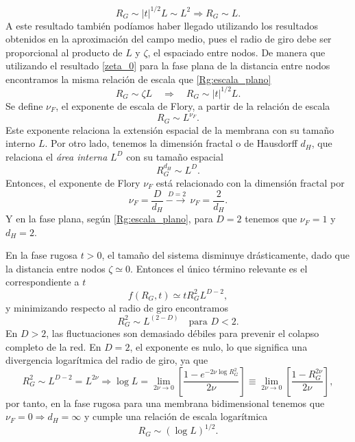 \begin{equation}\label{Rg:escala_plano}
R_G\sim |t|^{1/2}L\sim L^2 \Rightarrow R_G\sim L.
\end{equation}
A este resultado también podíamos haber llegado utilizando los resultados
obtenidos en la aproximación del campo medio, pues el radio de giro debe ser
proporcional al producto de $L$ y $\zeta$, el espaciado entre
nodos. De manera que utilizando el resultado \eqref{zeta_0} para la fase plana
de la distancia entre nodos encontramos la misma relación de escala que \eqref{Rg:escala_plano}
\begin{equation*}
R_G\sim \zeta L \quad \Rightarrow \quad R_G\sim |t|^{1/2}L.
\end{equation*}
Se define $\nu_F$, el exponente de escala de Flory, a partir de la relación de
escala
\begin{equation*}
 R_G\sim L^{\nu_F}. 
\end{equation*}
Este exponente relaciona la extensión espacial de la membrana con su tamaño
interno $L$. Por otro lado, tenemos la dimensión fractal o de Hausdorff $d_H$,
que relaciona el \textit{área interna} $L^D$ con su tamaño espacial
\begin{equation*}
R_G^{d_H}\sim L^D.
\end{equation*} 
Entonces, el exponente de Flory $\nu_F$ está relacionado con la dimensión
fractal por
\begin{equation*}
 \nu_F=\frac{D}{d_H}\ \stackrel{D=2}{-\!\!\!\longrightarrow}\ \nu_F=\frac{2}{d_H}.
\end{equation*}
Y en la fase plana, según \eqref{Rg:escala_plano}, para $D=2$ tenemos que
$\nu_F=1$ y $d_H=2$.


En la fase rugosa $t>0$, el tamaño del sistema disminuye drásticamente, dado que la distancia
entre nodos $\zeta\simeq 0$. Entonces el único término relevante es el correspondiente a $t$
\begin{equation*}
f(R_G,t)\simeq t R_G^2 L^{D-2}, 
\end{equation*}
y minimizando respecto al radio de giro encontramos
\begin{equation*}
R_G^2\sim L^{(2-D)} \quad \text{para } D<2.
\end{equation*}
En $D>2$, las fluctuaciones son demasiado débiles para prevenir el colapso
completo de la red. En $D=2$, el exponente es nulo, lo que significa una
divergencia logarítmica del radio de giro, ya que
\begin{equation*}
R_G^2\sim L^{D-2}=L^{2\nu}\Rightarrow \log L=\lim_{2\nu\rightarrow
  0}\left[\frac{1-e^{-2\nu\log R^2_G}}{2\nu}\right]\equiv\lim_{2\nu\rightarrow
  0}\left[\frac{1-R^{2\nu}_G}{2\nu}\right],
\end{equation*}
por tanto, en la fase rugosa para una membrana bidimensional tenemos que
$\nu_F=0\Rightarrow d_H=\infty$ y cumple una relación de escala logarítmica  
\begin{equation*}
R_G\sim(\log L)^{1/2}.
\end{equation*}

